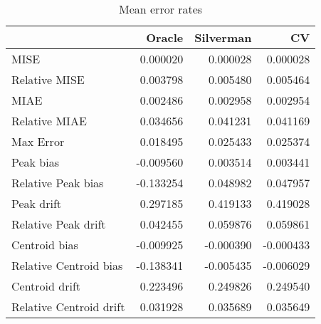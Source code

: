 \begin{table}[ht]
\centering
\begin{tabular}{lrrr}
  \hline
 & Oracle & Silverman & CV \\ 
  \hline
MISE & 0.000020 & 0.000028 & 0.000028 \\ 
  Relative MISE & 0.003798 & 0.005480 & 0.005464 \\ 
  MIAE & 0.002486 & 0.002958 & 0.002954 \\ 
  Relative MIAE & 0.034656 & 0.041231 & 0.041169 \\ 
  Max Error & 0.018495 & 0.025433 & 0.025374 \\ 
  Peak bias & -0.009560 & 0.003514 & 0.003441 \\ 
  Relative Peak bias & -0.133254 & 0.048982 & 0.047957 \\ 
  Peak drift & 0.297185 & 0.419133 & 0.419028 \\ 
  Relative Peak drift & 0.042455 & 0.059876 & 0.059861 \\ 
  Centroid bias & -0.009925 & -0.000390 & -0.000433 \\ 
  Relative Centroid bias & -0.138341 & -0.005435 & -0.006029 \\ 
  Centroid drift & 0.223496 & 0.249826 & 0.249540 \\ 
  Relative Centroid drift & 0.031928 & 0.035689 & 0.035649 \\ 
   \hline
\end{tabular}
\caption{Mean error rates} 
\label{tbl:mean_error_rates}
\end{table}
